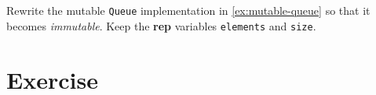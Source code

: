 \documentclass[oneside,11pt,dvipsnames]{book}
\newcommand{\code}[1]{\texttt{#1}}
\begin{document}
Rewrite the mutable \code{Queue} implementation in \autoref{ex:mutable-queue} so that it becomes \emph{immutable}. Keep the \textbf{rep} variables \code{elements} and \code{size}.







\section{Exercise}
\end{document}
